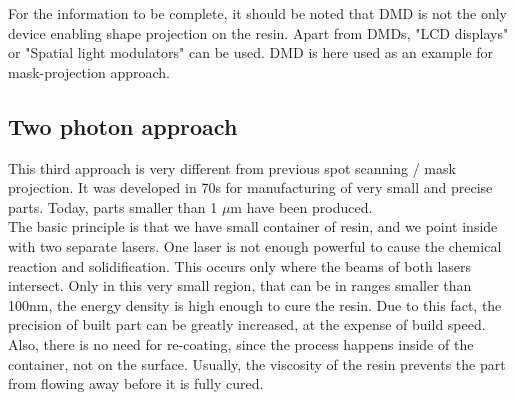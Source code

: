 \documentclass[a4paper, twoside, 11pt]{report}
\begin{document}
For the information to be complete, it should be noted that DMD is not the only device enabling shape projection on the resin. Apart from DMDs, "LCD displays" or "Spatial light modulators" can be used. DMD is here used as an example for mask-projection approach.\\
%
\subsection{Two photon approach}
This third approach is very different from previous spot scanning / mask projection. It was developed in 70s for manufacturing of very small and precise parts. Today, parts smaller than 1 $\mu$m have been produced.\\
The basic principle is that we have small container of resin, and we point inside with two separate lasers. One laser is not enough powerful to cause the chemical reaction and solidification. This occurs only where the beams of both lasers intersect. Only in this very small region, that can be in ranges smaller than 100nm, the energy density is high enough to cure the resin. Due to this fact, the precision of built part can be greatly increased, at the expense of build speed. Also, there is no need for re-coating, since the process happens inside of the container, not on the surface. Usually, the viscosity of the resin prevents the part from flowing away before it is fully cured.
%
%
\end{document}
